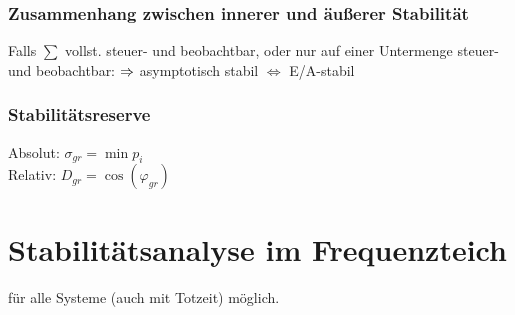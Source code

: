 \documentclass[fs, footer]{latex4ei}
\begin{document}
\begin{multicols*}{4}
{\subsubsection*{Zusammenhang zwischen innerer und äußerer Stabilität}
Falls $\sum$ vollst. steuer- und beobachtbar, oder nur auf einer Untermenge steuer- und beobachtbar:
$\Rightarrow$ asymptotisch stabil $\Leftrightarrow$ E/A-stabil\\

\subsubsection*{Stabilitätsreserve}
Absolut: $\sigma_{gr} = \min p_i$ \\

Relativ: $D_{gr} = \cos(\varphi_{gr})$
}

\columnbreak
\section{Stabilitätsanalyse im Frequenzteich}
für alle Systeme (auch mit Totzeit) möglich.



\end{multicols*}
\end{document}
